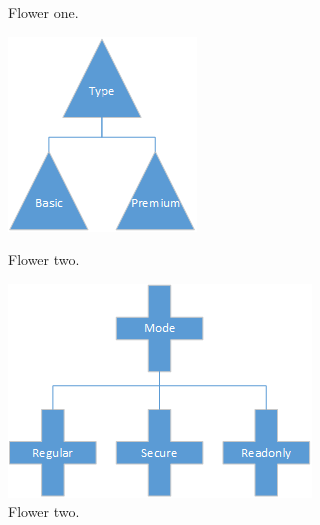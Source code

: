 \documentclass[paper=a4, fontsize=11pt]{scrartcl} %
\numberwithin{equation}{section} %
\numberwithin{figure}{section} %
\numberwithin{table}{section} %
\begin{document}
\begin{figure}[h]
\begin{minipage}[b]{0.35\textwidth}
    \caption{Flower one.}
  \end{minipage}
  \hfill
  \begin{minipage}[b]{0.2\textwidth}
    \includegraphics[width=\textwidth]{sig_types.png}
    \caption{Flower two.}
  \end{minipage}
  \hfill
  \begin{minipage}[b]{0.35\textwidth}
    \includegraphics[width=\textwidth]{sig_modes.png}
    \caption{Flower two.}
  \end{minipage}
\end{figure}
\end{document}
